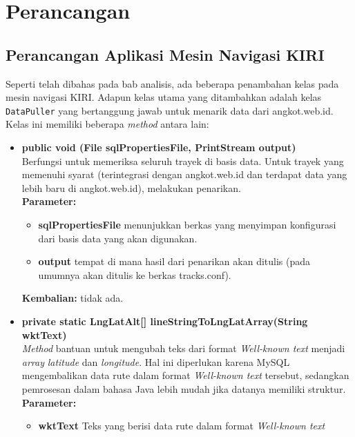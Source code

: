 \chapter{Perancangan}
\label{chap:perancangan}

\section{Perancangan Aplikasi Mesin Navigasi KIRI}

Seperti telah dibahas pada bab analisis, ada beberapa penambahan kelas pada mesin navigasi KIRI. Adapun kelas utama yang ditambahkan adalah kelas \verb/DataPuller/ yang bertanggung jawab untuk menarik data dari angkot.web.id. Kelas ini memiliki beberapa \textit{method} antara lain:

\begin{itemize}
	\item \textbf{public void (File sqlPropertiesFile, PrintStream output)} \\
		Berfungsi untuk memeriksa seluruh trayek di basis data. Untuk trayek yang memenuhi syarat (terintegrasi dengan angkot.web.id dan terdapat data yang lebih baru di angkot.web.id), melakukan penarikan. \\
		\textbf{Parameter:}
		\begin{itemize}
			\item \textbf{sqlPropertiesFile} menunjukkan berkas yang menyimpan konfigurasi dari basis data yang akan digunakan.
			\item \textbf{output} tempat di mana hasil dari penarikan akan ditulis (pada umumnya akan ditulis ke berkas tracks.conf).
		\end{itemize}
		\textbf{Kembalian:} tidak ada.
	\item \textbf{private static LngLatAlt[] lineStringToLngLatArray(String wktText)} \\
		\textit{Method} bantuan untuk mengubah teks dari format \textit{Well-known text} \cite{Herring:2011} menjadi \textit{array} \textit{latitude} dan \textit{longitude}. Hal ini diperlukan karena MySQL mengembalikan data rute dalam format \textit{Well-known text} tersebut, sedangkan pemrosesan dalam bahasa Java lebih mudah jika datanya memiliki struktur. \\
		\textbf{Parameter:}
		\begin{itemize}
			\item \textbf{wktText} Teks yang berisi data rute dalam format \textit{Well-known text}
		\end{itemize}

\end{itemize}

